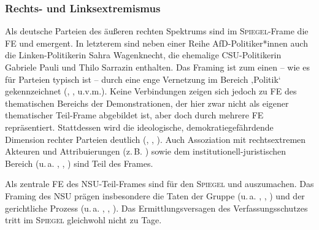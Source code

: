 \subsubsection{Rechts- und Linksextremismus}\label{rechts--und-linksextremismus-9}

Als deutsche Parteien des äußeren rechten Spektrums sind im \textsc{Spiegel}-Frame die FE  und  emergent. In letzterem sind neben einer Reihe AfD-Politiker*innen auch die Linken-Politikerin Sahra Wagenknecht, die ehemalige CSU-Politikerin Gabriele Pauli und Thilo Sarrazin enthalten. Das Framing ist zum einen -- wie es für Parteien typisch ist -- durch eine enge Vernetzung im Bereich ‚Politik` gekennzeichnet (, ,  u.v.m.). Keine Verbindungen zeigen sich jedoch zu FE des thematischen Bereichs der Demonstrationen, der hier zwar nicht als eigener thematischer Teil-Frame abgebildet ist, aber doch durch mehrere FE repräsentiert. Stattdessen wird die ideologische, demokratiegefährdende Dimension rechter Parteien deutlich (, , ). Auch Assoziation mit rechtsextremen Akteuren und Attribuierungen (z.\,B. ) sowie dem institutionell-juristischen Bereich (u.\,a. , , ) sind Teil des Frames.

Als zentrale FE des NSU-Teil-Frames sind für den \textsc{Spiegel}  und  auszumachen. Das Framing des NSU prägen insbesondere die Taten der Gruppe (u.\,a. , , ) und der gerichtliche Prozess (u.\,a. , , ). Das Ermittlungsversagen des Verfassungsschutzes tritt im \textsc{Spiegel} gleichwohl nicht zu Tage.

